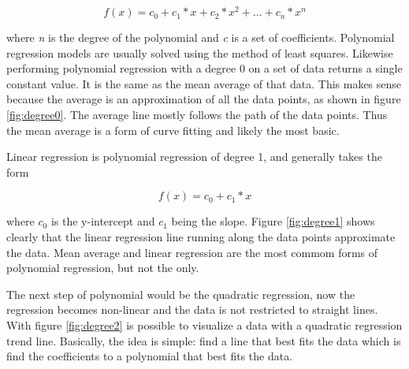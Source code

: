 \documentclass[ppgc,mestrado,english]{iiufrgs}
\begin{document}
\begin{equation} \label{eq:polynomialForm}
f(x) = c_0 + c_1 * x + c_2 * x^2 + ... + c_n * x^n
\end{equation}

where \emph{n} is the degree of the polynomial and \emph{c} is a set of coefficients. Polynomial regression models are usually solved using the method of least squares. Likewise performing polynomial regression with a degree 0 on a set of data returns a single constant value. It is the same as the mean average of that data. This makes sense because the average is an approximation of all the data points, as shown in figure \ref{fig:degree0}. The average line mostly follows the path of the data points. Thus the mean average is a form of curve fitting and likely the most basic.


Linear regression is polynomial regression of degree 1, and generally takes the form

\begin{equation} \label{eq:polynomialFormSmall}
f(x) = c_0 + c_1 * x
\end{equation}

where \emph{$c_0$} is the y-intercept and \emph{$c_1$} being the slope. Figure \ref{fig:degree1} shows clearly that the linear regression line running along the data points approximate the data. Mean average and linear regression are the most commom forms of polynomial regression, but not the only.


The next step of polynomial would be the quadratic regression, now the regression becomes non-linear and the data is not restricted to straight lines. With figure \ref{fig:degree2} is possible to visualize a data with a quadratic regression trend line. Basically, the idea is simple: find a line that best fits 
the data which is find the coefficients to a polynomial that best fits the data.

\end{document}
